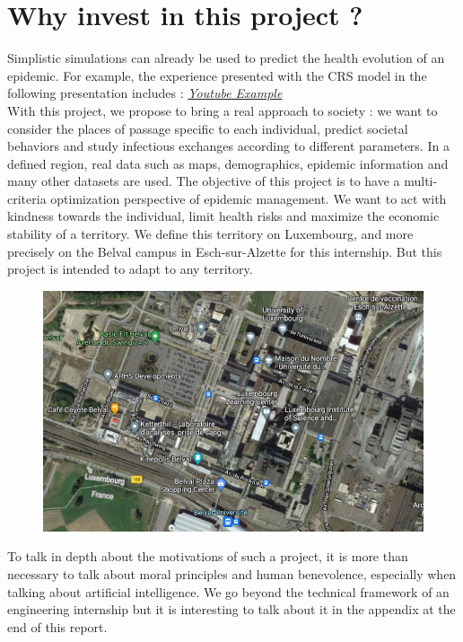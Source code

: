\section*{Why invest in this project ?}

Simplistic simulations can already be used to predict the health evolution of an epidemic. For example, the experience presented with the CRS model in the following presentation includes : \href{https://www.youtube.com/watch?v=gxAaO2rsdIs}{\textit{Youtube Example}}\\

With this project, we propose to bring a real approach to society : we want to consider the places of passage specific to each individual, predict societal behaviors and study infectious exchanges according to different parameters. In a defined region, real data such as maps, demographics, epidemic information and many other datasets are used. The objective of this project is to have a multi-criteria optimization perspective of epidemic management. We want to act with kindness towards the individual, limit health risks and maximize the economic stability of a territory. We define this territory on Luxembourg, and more precisely on the Belval campus in Esch-sur-Alzette for this internship. But this project is intended to adapt to any territory.\\

\begin{figure}[h]
  \centering
  \includegraphics[width=0.8\linewidth]{Media/BelvalMaps.png}
  \caption{}
  \label{fig:belvalmaps}
\end{figure}

To talk in depth about the motivations of such a project, it is more than necessary to talk about moral principles and human benevolence, especially when talking about artificial intelligence. We go beyond the technical framework of an engineering internship but it is interesting to talk about it in the appendix at the end of this report. \\

